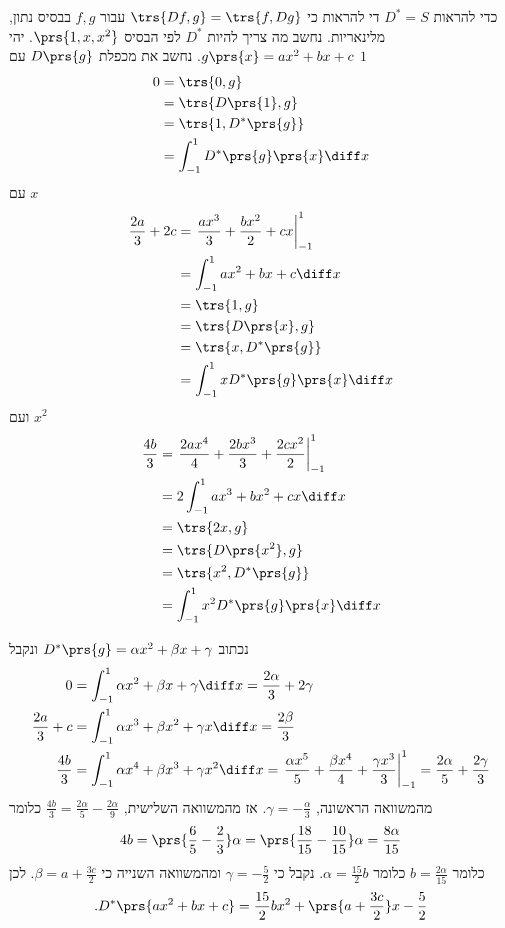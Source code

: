 \documentclass[a4paper,10pt,twoside,openany]{book}
\begin{document}
\begin{solution}
כדי להראות
$D^* = S$
די להראות כי
$\trs{Df,g} = \trs{f,Dg}$
עבור
$f,g$
בבסיס נתון, מלינאריות.
נחשב מה צריך להיות
$D^*$
לפי הבסיס
$\prs{1,x,x^2}$.
יהי
$g\prs{x} = ax^2 + bx + c$.
נחשב את מכפלת
$D\prs{g}$
עם
$1$
\begin{align*}
    0 &= \trs{0,g} \\&= \trs{D\prs{1}, g} \\&= \trs{1, D^*\prs{g}} \\&= \int_{-1}^1 D^*\prs{g}\prs{x} \diff x
\end{align*}
עם
$x$
\begin{align*}
        \frac{2a}{3} + 2c &= \left. \frac{ax^3}{3} + \frac{bx^2}{2} + cx \right|_{-1}^1 \\&= \int_{-1}^1 ax^2 + bx + c \diff x \\&= \trs{1,g} \\&= \trs{D\prs{x}, g} \\&= \trs{x, D^*\prs{g}} \\&= \int_{-1}^1 x D^*\prs{g}\prs{x} \diff x
\end{align*}
ועם
$x^2$
\begin{align*}
        \frac{4b}{3} &= \left. \frac{2ax^4}{4} + \frac{2bx^3}{3} + \frac{2cx^2}{2} \right|_{-1}^1 \\&= 2 \int_{-1}^1 ax^3 + bx^2 + cx \diff x \\&= \trs{2x,g} \\&= \trs{D\prs{x^2}, g} \\&= \trs{x^2, D^*\prs{g}} \\&= \int_{-1}^1 x^2 D^*\prs{g}\prs{x} \diff x
\end{align*}

נכתוב
$D^*\prs{g} = \alpha x^2 + \beta x + \gamma$
ונקבל
\begin{align*}
    0 &= \int_{-1}^1 \alpha x^2 + \beta x + \gamma \diff x = \frac{2 \alpha}{3} + 2 \gamma \\
    \frac{2a}{3} + c &= \int_{-1}^1 \alpha x^3 + \beta x^2 + \gamma x \diff x = \frac{2\beta}{3} \\
    \frac{4b}{3} &= \int_{-1}^1 \alpha x^4 + \beta x^3 + \gamma x^2 \diff x = \left. \frac{\alpha x^5}{5} + \frac{\beta x^4}{4} + \frac{\gamma x^3}{3} \right|_{-1}^1 = \frac{2 \alpha}{5} + \frac{2 \gamma}{3}
\end{align*}
מהמשוואה הראשונה,
$\gamma = -\frac{\alpha}{3}$.
אז מהמשוואה השלישית,
$\frac{4b}{3} = \frac{2 \alpha}{5} - \frac{2 \alpha}{9}$
כלומר
\[4b = \prs{\frac{6}{5} - \frac{2}{3}}\alpha = \prs{\frac{18}{15} - \frac{10}{15}}\alpha = \frac{8 \alpha}{15}\]
כלומר
$b = \frac{2 \alpha}{15}$
כלומר
$\alpha = \frac{15}{2} b$.
נקבל כי
$\gamma = -\frac{5}{2}$
ומהמשוואה השנייה כי
$\beta = a + \frac{3c}{2}$.
לכן
\[\text{.} D^*\prs{ax^2 + bx + c} = \frac{15}{2} b x^2 + \prs{a + \frac{3c}{2}}x - \frac{5}{2}\]
\end{solution}
\end{document}
